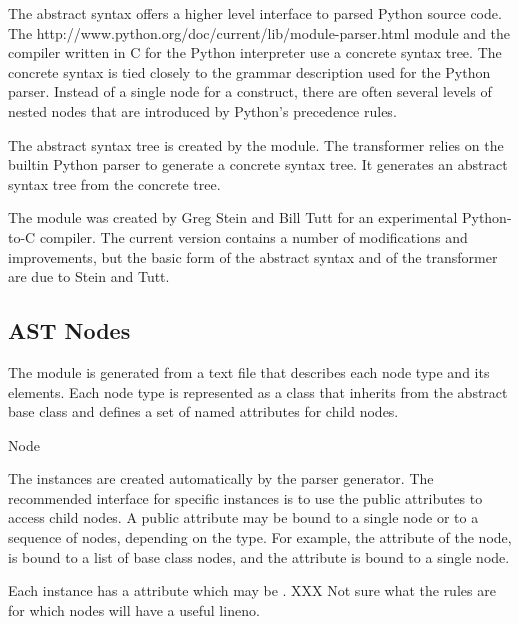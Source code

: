 \documentclass{howto}
\begin{document}
The abstract syntax offers a higher level interface to parsed Python
source code.  The 
{http://www.python.org/doc/current/lib/module-parser.html}
module and the compiler written in C for the Python interpreter use a
concrete syntax tree.  The concrete syntax is tied closely to the
grammar description used for the Python parser.  Instead of a single
node for a construct, there are often several levels of nested nodes
that are introduced by Python's precedence rules.

The abstract syntax tree is created by the
 module.  The transformer relies on the
builtin Python parser to generate a concrete syntax tree.  It
generates an abstract syntax tree from the concrete tree.  

The  module was created by Greg
Stein and Bill Tutt for an
experimental Python-to-C compiler.  The current version contains a
number of modifications and improvements, but the basic form of the
abstract syntax and of the transformer are due to Stein and Tutt.

\subsection{AST Nodes}


The  module is generated from a text file that
describes each node type and its elements.  Each node type is
represented as a class that inherits from the abstract base class
 and defines a set of named attributes for
child nodes.

\begin{classdesc}{Node}{}
  
  The  instances are created automatically by the parser
  generator.  The recommended interface for specific 
  instances is to use the public attributes to access child nodes.  A
  public attribute may be bound to a single node or to a sequence of
  nodes, depending on the  type.  For example, the
   attribute of the  node, is bound to a
  list of base class nodes, and the  attribute is bound to
  a single node.
  
  Each  instance has a  attribute which may
  be .  XXX Not sure what the rules are for which nodes
  will have a useful lineno.
\end{classdesc}
\end{document}

